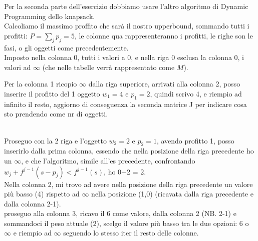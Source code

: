 \documentclass{article}
\begin{document}
 Per la seconda parte dell'esercizio dobbiamo usare l'altro algoritmo di Dynamic Programming dello knapsack.\\
 Calcoliamo il massimo proffito che sarà il nostro upperbound, sommando tutti i profitti: $\displaystyle P=\sum_{j} p_j =5$, le colonne qua rappresenteranno i profitti, le righe son le fasi, o gli oggetti come precedentemente.\\
 
Imposto nella colonna 0, tutti i valori a 0, e nella riga 0 esclusa la colonna 0, i valori ad $\infty$ (che nelle tabelle verrà rappresentato come $M$).

Per la colonna 1 ricopio $\infty$ dalla riga superiore, arrivati alla colonna 2, posso inserire il profitto del 1 oggetto $w_1=4$ e $p_1=2$, quindi scrivo 4, e riempio ad infinito il resto, aggiorno di conseguenza la seconda matrice J per indicare cosa sto prendendo come nr di oggetti.

\\
Proseguo con la 2 riga e l'oggetto $w_2=2$ e $p_2=1$, avendo profitto 1, posso inserirlo dalla prima colonna, essendo che nella posizione della riga precedente ho un $\infty$, e che l'algoritmo, simile all'es precedente, confrontando $w_j + f^{j-1}(s-p_j)<f^{j-1}(s)$, ho 0+2 = 2.\\
Nella colonna 2, mi trovo ad avere nella posizione della riga precedente un valore più basso (4) rispetto ad $\infty$ nella posizione (1,0) (ricavata dalla riga precedente e dalla colonna 2-1).\\
proseguo alla colonna 3, ricavo il 6 come valore, dalla colonna 2 (NB. 2-1) e sommandoci il peso attuale (2), scelgo il valore più basso tra le due opzioni: 6 o $\infty$  e riempio ad $\infty$ seguendo lo stesso iter il resto delle colonne.
\end{document}
